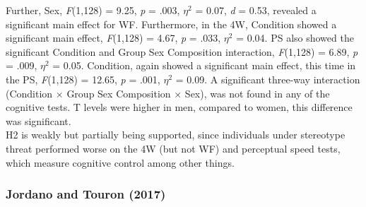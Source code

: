 \documentclass[
  stu,floatsintext]{apa7}
\begin{document}
Further, Sex, \emph{F}(1,128) = 9.25, \emph{p} = .003, \(\eta^{2}\) = 0.07, \emph{d} = 0.53, revealed a significant main effect for WF.
Furthermore, in the 4W, Condition showed a significant main effect, \emph{F}(1,128) = 4.67, \emph{p} = .033, \(\eta^{2}\) = 0.04.
PS also showed the significant Condition and Group Sex Composition interaction, \emph{F}(1,128) = 6.89, \emph{p} = .009, \(\eta^{2}\) = 0.05.
Condition, again showed a significant main effect, this time in the PS, \emph{F}(1,128) = 12.65, \emph{p} = .001, \(\eta^{2}\) = 0.09.
A significant three-way interaction (Condition \(\times\) Group Sex Composition \(\times\) Sex), was not found in any of the cognitive tests.
T levels were higher in men, compared to women, this difference was significant.\\
H2 is weakly but partially being supported, since individuals under stereotype threat performed worse on the 4W (but not WF) and perceptual speed tests, which measure cognitive control among other things.

\subsubsection{Jordano and Touron (2017)}\label{jordanoprimingperformancerelatedconcerns2017}
\end{document}
